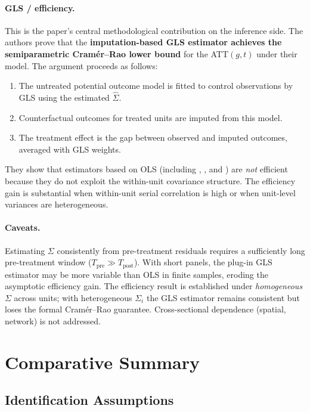 \documentclass[12pt]{article}
\begin{document}
\paragraph{GLS / efficiency.}
This is the paper's central methodological contribution on the inference side.
The authors prove that the \textbf{imputation-based GLS estimator achieves the
semiparametric Cram\'{e}r--Rao lower bound} for the ATT$(g,t)$ under their model.
The argument proceeds as follows:
\begin{enumerate}
  \item The untreated potential outcome model is fitted to control observations
        by GLS using the estimated $\hat{\Sigma}$.
  \item Counterfactual outcomes for treated units are imputed from this model.
  \item The treatment effect is the gap between observed and imputed outcomes,
        averaged with GLS weights.
\end{enumerate}
They show that estimators based on OLS (including
\citealt{callaway2021difference},
\citealt{sun2021estimating}, and
\citealt{gardner2024twostage})
are \textit{not} efficient because they do not exploit the within-unit
covariance structure.
The efficiency gain is substantial when within-unit serial correlation is high
or when unit-level variances are heterogeneous.

\paragraph{Caveats.}
Estimating $\Sigma$ consistently from pre-treatment residuals requires a
sufficiently long pre-treatment window ($T_{\text{pre}} \gg T_{\text{post}}$).
With short panels, the plug-in GLS estimator may be more variable than OLS
in finite samples, eroding the asymptotic efficiency gain.
The efficiency result is established under \textit{homogeneous} $\Sigma$ across
units; with heterogeneous $\Sigma_i$ the GLS estimator remains consistent but
loses the formal Cram\'{e}r--Rao guarantee.
Cross-sectional dependence (spatial, network) is not addressed.

\section{Comparative Summary}

\subsection{Identification Assumptions}
\end{document}
